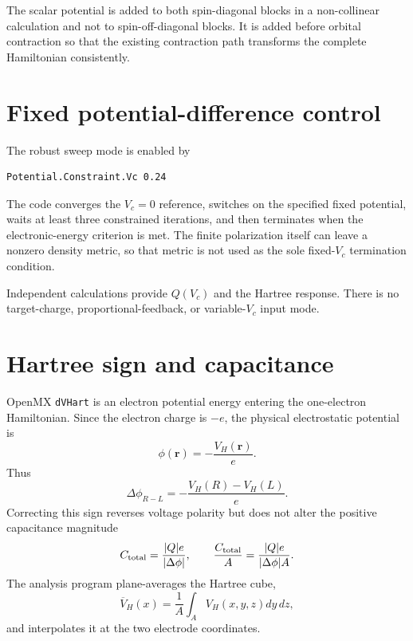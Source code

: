 \documentclass[11pt,a4paper]{article}
\begin{document}
The scalar potential is added to both spin-diagonal blocks in a
non-collinear calculation and not to spin-off-diagonal blocks. It is added
before orbital contraction so that the existing contraction path transforms
the complete Hamiltonian consistently.

\section{Fixed potential-difference control}

The robust sweep mode is enabled by
\begin{lstlisting}[language={}]
Potential.Constraint.Vc 0.24
\end{lstlisting}
The code converges the $V_c=0$ reference, switches on the specified fixed
potential, waits at least three constrained iterations, and then terminates
when the electronic-energy criterion is met. The finite polarization itself
can leave a nonzero density metric, so that metric is not used as the sole
fixed-$V_c$ termination condition.

Independent calculations provide $Q(V_c)$ and the Hartree response. There is
no target-charge, proportional-feedback, or variable-$V_c$ input mode.

\section{Hartree sign and capacitance}

OpenMX \texttt{dVHart} is an electron potential energy entering the
one-electron Hamiltonian. Since the electron charge is $-e$, the physical
electrostatic potential is
\begin{equation}
 \phi(\bm r)=-\frac{V_H(\bm r)}{e}.
 \label{eq:sign}
\end{equation}
Thus
\begin{equation}
 \Delta\phi_{R-L}=-\frac{V_H(R)-V_H(L)}{e}.
\end{equation}
Correcting this sign reverses voltage polarity but does not alter the
positive capacitance magnitude
\begin{equation}
 C_{\rm total}=\frac{|Q|e}{|\Delta\phi|},\qquad
 \frac{C_{\rm total}}{A}=\frac{|Q|e}{|\Delta\phi|A}.
\end{equation}
The analysis program plane-averages the Hartree cube,
\begin{equation}
 \overline V_H(x)=\frac{1}{A}\int_A V_H(x,y,z)dy\,dz,
\end{equation}
and interpolates it at the two electrode coordinates.
\end{document}
